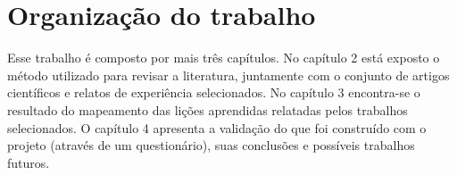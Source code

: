 \section{Organização do trabalho}

Esse trabalho é composto por mais três capítulos. No capítulo 2 está exposto o método utilizado para revisar a literatura, juntamente com o conjunto de artigos científicos e relatos de experiência selecionados. No capítulo 3 encontra-se o resultado do mapeamento das lições aprendidas relatadas pelos trabalhos selecionados. O capítulo 4 apresenta a validação do que foi construído com o projeto (através de um questionário), suas conclusões e possíveis trabalhos futuros.
